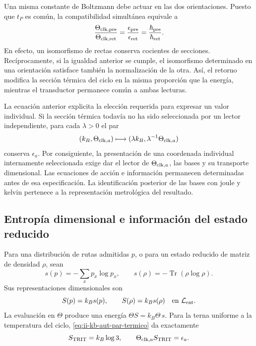 Una misma constante de Boltzmann debe actuar en las dos orientaciones.
Puesto que \(t_P\) es común, la compatibilidad simultánea equivale a
\begin{equation}
 \frac{\Theta_{{\rm clk},{\rm pre}}}{\Theta_{{\rm clk},{\rm ret}}}
 =\frac{\epsilon_{\rm pre}}{\epsilon_{\rm ret}}
 =\frac{\hbar_{\rm pre}}{\hbar_{\rm ret}}.
 \label{eq:ii-kb-aut-orientaciones}
\end{equation}
En efecto, un isomorfismo de rectas conserva cocientes de secciones.
Recíprocamente, si la igualdad anterior se cumple, el isomorfismo
determinado en una orientación satisface también la normalización de
la otra. Así, el retorno modifica la sección térmica del ciclo en la
misma proporción que la energía, mientras el transductor permanece
común a ambas lecturas.

La ecuación anterior explicita la elección requerida para expresar un
valor individual. Si la sección térmica todavía no ha sido seleccionada
por un lector independiente, para cada \(\lambda>0\) el par
\[
 (k_B,\Theta_{{\rm clk},a})
 \longmapsto(\lambda k_B,\lambda^{-1}\Theta_{{\rm clk},a})
\]
conserva \(\epsilon_a\). Por consiguiente, la presentación de una
coordenada individual internamente seleccionada exige dar el lector de
\(\Theta_{{\rm clk},a}\), las bases y su transporte dimensional.
Las ecuaciones de acción e información permanecen determinadas antes
de esa especificación. La identificación posterior de las bases con
joule y kelvin pertenece a la representación metrológica del resultado.

\subsection{Entropía dimensional e información del estado reducido}

Para una distribución de rutas admitidas \(p\), o para un estado
reducido de matriz de densidad \(\rho\), sean
\[
 s(p)=-\sum_xp_x\log p_x,\qquad
 s(\rho)=-\operatorname{Tr}(\rho\log\rho).
\]
Sus representaciones dimensionales son
\begin{equation}
 S(p)=k_Bs(p),\qquad S(\rho)=k_Bs(\rho)
 \quad\text{en }\mathcal L_{\rm ent}.
 \label{eq:ii-kb-aut-entropia}
\end{equation}
La evaluación en \(\Theta\) produce una energía
\(\Theta S=k_B\Theta\,s\). Para la terna uniforme a la temperatura
del ciclo, \eqref{eq:ii-kb-aut-par-termico} da exactamente
\[
 S_{\rm TRIT}=k_B\log3,\qquad
 \Theta_{{\rm clk},a}S_{\rm TRIT}=\epsilon_a.
\]

